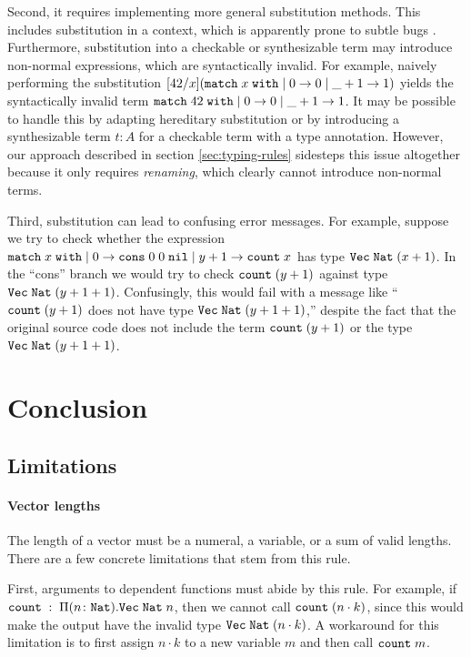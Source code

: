 \documentclass[acmsmall,nonacm]{acmart}
\begin{document}
Second, it requires implementing more general substitution methods.
This includes substitution in a context, which is apparently prone to subtle bugs \cite{clare-subst-in-ctxt}.
Furthermore, substitution into a checkable or synthesizable term may introduce non-normal expressions, which are syntactically invalid.
For example, naively performing the substitution $[42/x](\texttt{match} \; x \; \texttt{with} \; | \; 0 \rightarrow 0 \; | \; \_ + 1 \rightarrow 1)$ yields the syntactically invalid term $\texttt{match} \; 42 \; \texttt{with} \; | \; 0 \rightarrow 0 \; | \; \_ + 1 \rightarrow 1$.
It may be possible to handle this by adapting hereditary substitution \cite{comp523-lec-dependent-types} or by introducing a synthesizable term $t:A$ for a checkable term with a type annotation.
However, our approach described in section \ref{sec:typing-rules} sidesteps this issue altogether because it only requires \emph{renaming}, which clearly cannot introduce non-normal terms.

Third, substitution can lead to confusing error messages.
For example, suppose we try to check whether the expression $\texttt{match} \; x \; \texttt{with} \; | \; 0 \rightarrow \texttt{cons} \; 0 \; 0 \; \texttt{nil} \; | \; y + 1 \rightarrow \texttt{count} \; x$ has type $\texttt{Vec} \; \texttt{Nat} \; (x+1)$.
In the ``cons'' branch we would try to check $\texttt{count} \; (y+1)$ against type $\texttt{Vec} \; \texttt{Nat} \; (y+1+1)$.
Confusingly, this would fail with a message like ``$\texttt{count} \; (y+1)$ does not have type $\texttt{Vec} \; \texttt{Nat} \; (y+1+1)$,'' despite the fact that the original source code does not include the term $\texttt{count} \; (y+1)$ or the type $\texttt{Vec} \; \texttt{Nat} \; (y+1+1)$.

\section{Conclusion}

\subsection{Limitations}

\paragraph{Vector lengths}
\label{sec:limitation-vec-len}
The length of a vector must be a numeral, a variable, or a sum of valid lengths.
There are a few concrete limitations that stem from this rule.

First, arguments to dependent functions must abide by this rule.
For example, if $\texttt{count} \; : \; \Pi (n \colon \texttt{Nat}) . \texttt{Vec} \; \texttt{Nat} \; n$, then we cannot call $\texttt{count} \; (n \cdot k)$, since this would make the output have the invalid type $\texttt{Vec} \; \texttt{Nat} \; (n \cdot k)$.
A workaround for this limitation is to first assign $n \cdot k$ to a new variable $m$ and then call $\texttt{count} \; m$.
\end{document}
